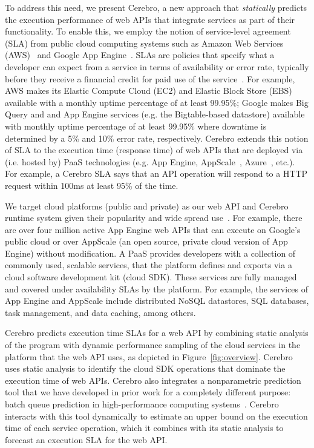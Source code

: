 To address this need, we present Cerebro, a new approach that
\textit{statically} predicts the execution performance of web APIs that 
integrate services as part of their functionality.
To enable this, we employ the notion of service-level agreement (SLA) from 
public cloud computing systems such as Amazon Web Services (AWS)~\cite{amazon-aws-web} and 
Google App Engine~\cite{gae}.  SLAs are policies that specify
what a developer can expect from a service in terms of availability or error rate,
typically before they receive a financial credit for paid
use of the service~\cite{aws-ec2-sla,aws-s3-sla,aws-rds-sla,gae-sla,gcs-sla}.
For example, AWS makes its Elastic Compute Cloud (EC2) and Elastic Block Store (EBS) 
available with a monthly uptime percentage 
of at least 99.95\%; Google makes Big Query and and App Engine services (e.g. the 
Bigtable-based datastore) available with monthly uptime percentage of at least 
99.95\% where downtime is determined by a 5\% and 10\% error rate, respectively.
Cerebro extends this notion of SLA to the execution time (response time) 
of web APIs that are deployed via (i.e. hosted by) PaaS
technologies (e.g. App Engine, 
AppScale~\cite{6488671}, Azure~\cite{azure-web}, etc.).
For example, a Cerebro SLA says that an API operation will respond to a HTTP request
within 100ms at least 95\% of the time.

We target cloud platforms (public and private) as our web API and Cerebro 
runtime system given their popularity and wide spread use~\cite{paas-growth}.
For example, there are over four million active App Engine web APIs that 
can execute on Google's public cloud or over AppScale (an open source, private 
cloud version of App Engine) without modification.  A PaaS provides developers 
with a collection of commonly used, scalable services,
that the platform defines and exports via a cloud software 
development kit (cloud SDK).  These services are fully managed and covered under 
availability SLAs by the platform. For example, the services 
of App Engine and AppScale 
include distributed NoSQL datastores, SQL databases, task management, 
and data caching, among others. 

Cerebro predicts execution time SLAs for a web API by combining static analysis
of the program with dynamic performance sampling of the cloud services 
in the platform that the web API uses, as depicted in Figure~\ref{fig:overview}.
Cerebro uses static analysis to identify the cloud SDK operations
that dominate the execution time of web APIs.  Cerebro also integrates a nonparametric
prediction tool that we have developed in prior work for a completely different 
purpose: batch queue prediction in high-performance computing 
systems~\cite{Nurmi:2007:QQB:1791551.1791556}. Cerebro interacts with this tool
dynamically to estimate an upper bound on the execution time of each service operation, 
which it combines with its static analysis to forecast an execution SLA for the web API.


